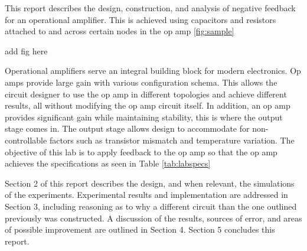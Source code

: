 



	
This report describes the design, construction, and analysis of negative feedback for an operational amplifier. This is achieved using capacitors and resistors attached to and across certain nodes in the op amp \ref{fig:sample}


add fig here	
	
	
	
	
Operational amplifiers serve an integral building block for modern electronics. Op amps provide large gain with various configuration schema. This allows the circuit designer to use the op amp in different topologies and achieve different results, all without modifying the op amp circuit itself. In addition, an op amp provides significant gain while maintaining stability, this is where the output stage comes in. The output stage allows design to accommodate for non-controllable factors such as transistor mismatch and temperature variation.   The objective of this lab is to apply feedback to the op amp so that the op amp achieves the specifications as seen in Table \ref{tab:labspecs}


\noindent Section 2 of this report describes the design, and when relevant, the simulations of the experiments. Experimental results and implementation are addressed in Section 3, including reasoning as to why a different circuit than the one outlined previously was constructed. A discussion of the results, sources of error, and areas of possible improvement are outlined in Section 4. Section 5 concludes this report. \newline


